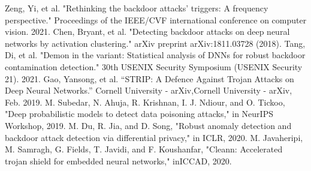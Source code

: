 \documentclass[conference]{IEEEtran}
\begin{document}
\begin{thebibliography}{00}
     Zeng, Yi, et al. "Rethinking the backdoor attacks' triggers: A frequency perspective." Proceedings of the IEEE/CVF international conference on computer vision. 2021.  
     Chen, Bryant, et al. "Detecting backdoor attacks on deep neural networks by activation clustering." arXiv preprint arXiv:1811.03728 (2018).  
     Tang, Di, et al. "Demon in the variant: Statistical analysis of {DNNs} for robust backdoor contamination detection." 30th USENIX Security Symposium (USENIX Security 21). 2021.
     Gao, Yansong, et al. “STRIP: A Defence Against Trojan Attacks on Deep Neural Networks.” Cornell University - arXiv,Cornell University - arXiv, Feb. 2019.  
     M. Subedar, N. Ahuja, R. Krishnan, I. J. Ndiour, and O. Tickoo, "Deep probabilistic models to detect data poisoning attacks," in NeurIPS Workshop, 2019.  
     M. Du, R. Jia, and D. Song, "Robust anomaly detection and backdoor attack detection via differential privacy," in ICLR, 2020.  
     M. Javaheripi, M. Samragh, G. Fields, T. Javidi, and F. Koushanfar, "Cleann: Accelerated trojan shield for embedded neural networks," inICCAD, 2020.





\end{thebibliography}
\end{document}
